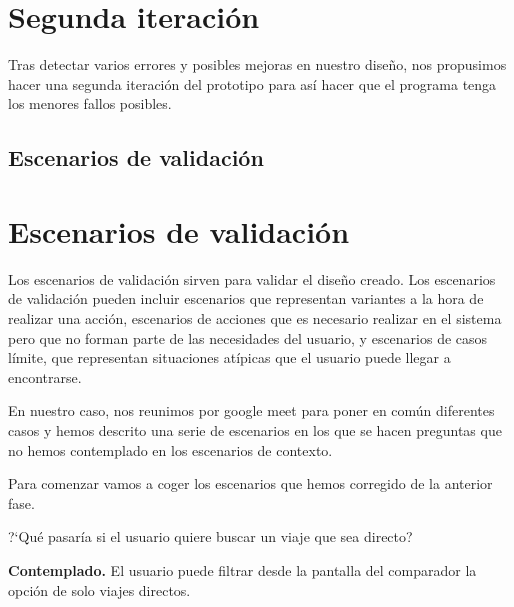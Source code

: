 









\section{Segunda iteración}

Tras detectar varios errores y posibles mejoras en nuestro diseño, nos propusimos hacer una segunda iteración del prototipo para así hacer que el programa tenga los menores fallos posibles.

\subsection{Escenarios de validación}

\section{Escenarios de validación}

Los escenarios de validación sirven para validar el diseño creado. Los escenarios de validación pueden incluir escenarios que representan variantes a la hora de realizar una acción, escenarios de acciones que es necesario realizar en el sistema pero que no forman parte de las necesidades del usuario, y escenarios de casos límite, que representan situaciones atípicas que el usuario puede llegar a encontrarse.

En nuestro caso, nos reunimos por google meet para poner en común diferentes casos y hemos descrito una serie de escenarios en los que se hacen preguntas que no hemos contemplado en los escenarios de contexto.

Para comenzar vamos a coger los escenarios que hemos corregido de la anterior fase.

\begin{escenario} %
    \centering
    ?`Qué pasaría si el usuario quiere buscar un viaje que sea directo?

    \begin{solucion}
        \centering
        \textbf{Contemplado.} El usuario puede filtrar desde la pantalla del comparador la opción de solo viajes directos.
    \end{solucion}
\end{escenario}


